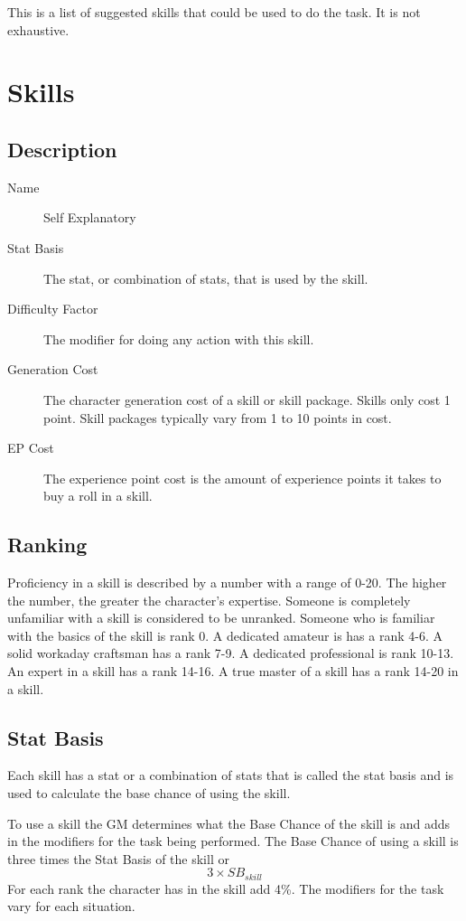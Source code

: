 This is a list of suggested skills that could be used to do the task. 
It is not exhaustive.

\section{Skills}
\subsection{Description}

\begin{description}
	\item[Name] 
	Self Explanatory
	\item[Stat Basis] 
	The stat, or combination of stats, that is used by the skill. 
	\item[Difficulty Factor] 
	The modifier for doing any action with this skill.
	\item[Generation Cost]
	The character generation cost of a skill or skill package. Skills
	only cost 1 point. Skill packages typically vary from 1
	to 10 points in cost.
	\item[EP Cost] 
	The experience point cost is the amount of experience points it takes to
	buy a roll in a skill. 
\end{description}

\subsection{Ranking}

Proficiency in a skill is described by a number with a range of 0-20.
The higher the number, the greater the character's expertise. Someone
is completely unfamiliar with a skill is considered to be
{unranked}. Someone who is familiar with the basics of
the skill is rank 0. A dedicated amateur is has a rank 4-6. A
solid workaday craftsman has a rank 7-9. A dedicated professional is rank 
10-13. An expert in a skill has a rank 14-16. A true master of a skill has 
a rank 14-20 in a skill. 

\subsection{Stat Basis}

Each skill has a stat or a combination of stats that is called the 
stat basis and is used to calculate the base chance of using the 
skill. 

To use a skill the GM determines what the Base Chance of the skill is 
and adds in the modifiers for the task being performed.
The Base Chance of using a skill is three times the Stat Basis of the skill
or \[ 3 \times SB_{skill} \] For each rank the character has in the skill add 4\%.
The modifiers for the task vary for each situation.

